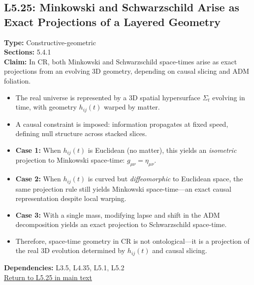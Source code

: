 \documentclass[12pt]{book}
\newcommand{\returnlink}[1]{\hyperref[logic:#1]{Return to #1 in main text}\xspace}
\begin{document}
\subsection*{L5.25: Minkowski and Schwarzschild Arise as Exact Projections of a Layered Geometry}
\label{appendix:L5.25}
\textbf{Type:} Constructive-geometric \\
\textbf{Sections:} 5.4.1 \\
\textbf{Claim:} In CR, both Minkowski and Schwarzschild space-times arise as exact projections from an evolving 3D geometry, depending on causal slicing and ADM foliation.
\begin{itemize}
  \item The real universe is represented by a 3D spatial hypersurface $\Sigma_t$ evolving in time, with geometry $h_{ij}(t)$ warped by matter.
  \item A causal constraint is imposed: information propagates at fixed speed, defining null structure across stacked slices.
  \item \textbf{Case 1:} When $h_{ij}(t)$ is Euclidean (no matter), this yields an \textit{isometric} projection to Minkowski space-time: $g_{\mu\nu} = \eta_{\mu\nu}$.
  \item \textbf{Case 2:} When $h_{ij}(t)$ is curved but \textit{diffeomorphic} to Euclidean space, the same projection rule still yields Minkowski space-time---an exact causal representation despite local warping.
  \item \textbf{Case 3:} With a single mass, modifying lapse and shift in the ADM decomposition yields an exact projection to Schwarzschild space-time.
  \item Therefore, space-time geometry in CR is not ontological---it is a projection of the real 3D evolution determined by $h_{ij}(t)$ and causal slicing.
\end{itemize}
\textbf{Dependencies:} L3.5, L4.35, L5.1, L5.2 \\
\returnlink{L5.25}
\end{document}
